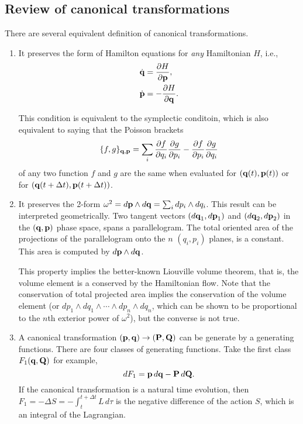 \documentclass[aip,jcp,preprint,notitlepage, superscriptaddress]{revtex4-1}
\begin{document}
\subsection{Review of canonical transformations}



There are several equivalent definition of canonical transformations.
%
\begin{enumerate}

\item
It preserves the form of Hamilton equations
for \emph{any} Hamiltonian $H$,
i.e.,
$$
\begin{aligned}
\dot {\mathbf q} &=  \frac{ \partial H }{ \partial \bm{\mathrm{p}} }, \\
\dot {\mathbf p} &= -\frac{ \partial H }{ \partial \bm{\mathrm{q}} }.
\end{aligned}
$$

This condition is equivalent to the symplectic conditoin,
which is also equivalent to saying that the Poisson brackets
$$
\{ f, g \}_{\bm{\mathrm{q}}, \bm{\mathrm{p}}} =
\sum_i
\frac{ \partial f } {\partial q_i}  \frac{ \partial g } { \partial p_i }
-
\frac{ \partial f } {\partial p_i}  \frac{ \partial g } { \partial q_i }
$$
of any two function $f$ and $g$ are the same
when evaluated for $(\bm{\mathrm{q}}(t), \bm{\mathrm{p}}(t))$
or for $(\bm{\mathrm{q}}(t+\Delta t), \bm{\mathrm{p}}(t+\Delta t))$.

\item
It preserves the 2-form
$\omega^2 = d\bm{\mathrm{p}} \wedge d\bm{\mathrm{q}} = \sum_i dp_i \wedge dq_i$.
%
This result can be interpreted geometrically.
%
Two tangent vectors
$(d\bm{\mathrm{q}}_1, d\bm{\mathrm{p}}_1)$ and $(d\bm{\mathrm{q}}_2, d\bm{\mathrm{p}}_2)$
in the $(\bm{\mathrm{q}}, \bm{\mathrm{p}})$ phase space,
spans a parallelogram.
%
The total oriented area of the projections
of the parallelogram onto the $n$ $(q_i, p_i)$ planes,
is a constant.
%
This area is computed by $d\bm{\mathrm{p}} \wedge d\bm{\mathrm{q}}$.

This property implies the better-known Liouville volume theorem,
that is, the volume element is a conserved by the Hamiltonian flow.
%
Note that the conservation of total projected area
implies the conservation of the volume element
(or $dp_1 \wedge dq_1 \wedge \cdots \wedge dp_n \wedge dq_n$,
which can be shown to be proportional to
the $n$th exterior power of $\omega^2$),
but the converse is not true.


\item
A canonical transformation $(\bm{\mathrm{p}}, \bm{\mathrm{q}}) \rightarrow (\bm{\mathrm{P}}, \bm{\mathrm{Q}})$
can be generate by a generating functions.
%
There are four classes of generating functions.
%
Take the first class $F_1(\bm{\mathrm{q}}, \bm{\mathrm{Q}})$ for example,
$$
dF_1 = \bm{\mathrm{p}} \, d\bm{\mathrm{q}} - \bm{\mathrm{P}} \, d\bm{\mathrm{Q}}.
$$
If the canonical transformation is a natural time evolution,
then $F_1 = -\Delta S = -\int_{t}^{t + \Delta t} L \, d\tau$
is the negative difference of the action $S$,
which is an integral of the Lagrangian.


\end{enumerate}
\end{document}
